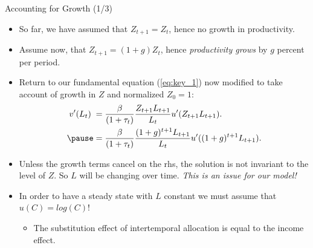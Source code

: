 \documentclass[10pt,c,aspectratio=1610,handout]{beamer}
\begin{document}
\begin{frame}{Accounting for Growth (1/3)}%
  \begin{itemize}%
    \item[$\blacktriangleright$] So far, we have assumed that $Z_{t+1} = Z_t$, hence no growth in productivity.%
    \pause%
    \item[$\blacktriangleright$] Assume now, that $Z_{t+1}=(1+g)Z_{t}$, hence \emph{productivity grows} by $g$ percent per period.%
    \pause%
    \item[$\blacktriangleright$] Return to our fundamental equation (\ref{eq:key_1}) now modified to take account of growth in $Z$ and normalized $Z_{0}=1:$%
    \begin{align*}
      v^{\prime}(L_{t}) \; = & \; \frac{\beta}{(1+\tau_{t})} \frac{Z_{t+1} L_{t+1}}{L_{t}} u^{\prime} (Z_{t+1} L_{t+1}).\\%
      \pause%
      = & \; \frac{\beta}{(1+\tau_{t})} \frac{(1+g)^{t+1} L_{t+1}}{L_{t}} u^{\prime} ((1+g)^{t+1} L_{t+1}).%
    \end{align*}%
    \pause%
    \item[$\blacktriangleright$] Unless the growth terms cancel on the rhs, the solution is not invariant to the level of $Z.$ So $L$ will be changing over time. \emph{This is an issue for our model!}%
    \pause%
    \item[$\blacktriangleright$] In order to have a steady state with $L$ constant we must assume that $u(C) = log(C)$!%
    \begin{itemize}%
      \item[$\rightarrow$] The substitution effect of intertemporal allocation is equal to the income effect.%
    \end{itemize}%
  \end{itemize}%
\end{frame}%
\end{document}
